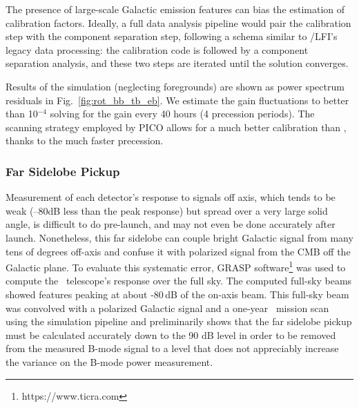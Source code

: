 \documentclass[PICOReport.tex]{subfiles}
\begin{document}
The presence of large-scale Galactic emission features can bias the estimation of calibration factors. Ideally, a full data analysis pipeline would pair the calibration step with the component separation step, following a schema similar to \planck/LFI's legacy data processing\cite{Planck2018_II}: the calibration code is followed by a component separation analysis, and these two steps are iterated until the solution converges.

Results of the simulation (neglecting foregrounds) are shown as power spectrum residuals in Fig.~\ref{fig:rot_bb_tb_eb}. 
We estimate the gain fluctuations to better than 10$^{-4}$ solving for the gain every 40 hours (4 precession periods).
The scanning strategy employed by PICO allows for a much better calibration than \planck, thanks to the much faster precession.

\subsubsection{Far Sidelobe Pickup}
\label{sec:fsl}
Measurement of each detector's response to signals off axis, which tends to be weak (--80dB less than the peak response) but spread over a very large solid angle, is difficult to do pre-launch, and may not even be done accurately after launch.  Nonetheless, this far sidelobe can couple bright Galactic signal from many tens of degrees off-axis and confuse it with polarized signal from the CMB off the Galactic plane.    To evaluate this systematic error, GRASP software\footnote{https://www.ticra.com} was used to compute the \pico\ telescope's response over the full sky.  The computed full-sky beams showed features peaking at about -80\,dB of the on-axis beam.   This full-sky beam was convolved with a polarized Galactic signal and a one-year \pico\ mission scan using the simulation pipeline and preliminarily shows that the far sidelobe pickup must be calculated accurately down to the 90 dB level in order to be removed from the measured B-mode signal to a level that does not appreciably increase the variance on the B-mode power measurement.
\end{document}
